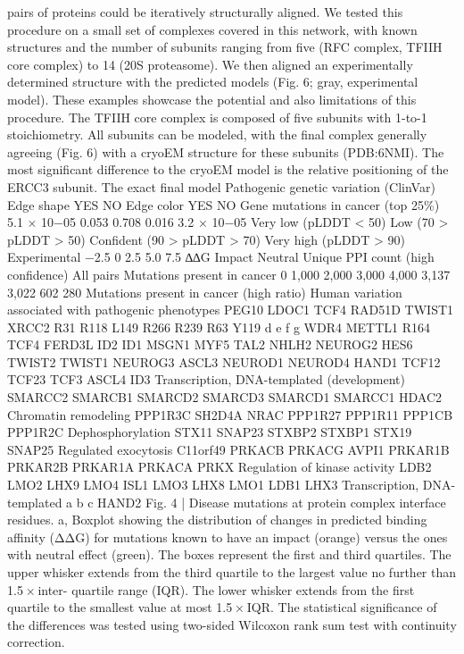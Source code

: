 pairs of proteins could be iteratively structurally aligned. We tested
this procedure on a small set of complexes covered in this network,
with known structures and the number of subunits ranging from five
(RFC complex, TFIIH core complex) to 14 (20S proteasome). We then
aligned an experimentally determined structure with the predicted
models (Fig. 6; gray, experimental model). These examples showcase
the potential and also limitations of this procedure.
The TFIIH core complex is composed of five subunits with 1-to-1
stoichiometry. All subunits can be modeled, with the final complex
generally agreeing (Fig. 6) with a cryoEM structure for these subunits
(PDB:6NMI). The most significant difference to the cryoEM model is
the relative positioning of the ERCC3 subunit. The exact final model
Pathogenic genetic variation
(ClinVar)
Edge shape
YES
NO
Edge color
YES
NO
Gene mutations in cancer
(top 25\%)
5.1 × 10−05
0.053
0.708
0.016
3.2 × 10−05
Very low (pLDDT < 50)
Low (70 > pLDDT > 50)
Confident (90 > pLDDT > 70)
Very high (pLDDT > 90)
Experimental
−2.5
0
2.5 5.0 7.5
∆∆G
Impact
Neutral
Unique PPI count (high confidence)
All pairs
Mutations
present in cancer
0
1,000
2,000
3,000
4,000
3,137
3,022
602
280
Mutations present
in cancer (high ratio)
Human variation associated
with pathogenic phenotypes
PEG10
LDOC1
TCF4
RAD51D
TWIST1
XRCC2
R31
R118
L149
R266
R239
R63
Y119
d
e
f
g
WDR4
METTL1
R164
TCF4
FERD3L
ID2
ID1
MSGN1
MYF5
TAL2
NHLH2
NEUROG2
HES6
TWIST2
TWIST1
NEUROG3
ASCL3
NEUROD1
NEUROD4
HAND1
TCF12
TCF23
TCF3
ASCL4
ID3
Transcription, DNA-templated (development)
SMARCC2
SMARCB1
SMARCD2
SMARCD3
SMARCD1
SMARCC1
HDAC2
Chromatin remodeling
PPP1R3C
SH2D4A
NRAC
PPP1R27
PPP1R11
PPP1CB
PPP1R2C
Dephosphorylation
STX11
SNAP23
STXBP2
STXBP1
STX19
SNAP25
Regulated exocytosis
C11orf49
PRKACB
PRKACG
AVPI1
PRKAR1B
PRKAR2B
PRKAR1A
PRKACA
PRKX
Regulation of kinase activity
LDB2
LMO2
LHX9
LMO4
ISL1
LMO3
LHX8
LMO1
LDB1
LHX3
Transcription, DNA-templated
a
b
c
HAND2
Fig. 4 | Disease mutations at protein complex interface residues. a, Boxplot
showing the distribution of changes in predicted binding affinity (ΔΔG) for
mutations known to have an impact (orange) versus the ones with neutral effect
(green). The boxes represent the first and third quartiles. The upper whisker
extends from the third quartile to the largest value no further than 1.5 × inter-
quartile range (IQR). The lower whisker extends from the first quartile to the
smallest value at most 1.5 × IQR. The statistical significance of the differences
was tested using two-sided Wilcoxon rank sum test with continuity correction.
